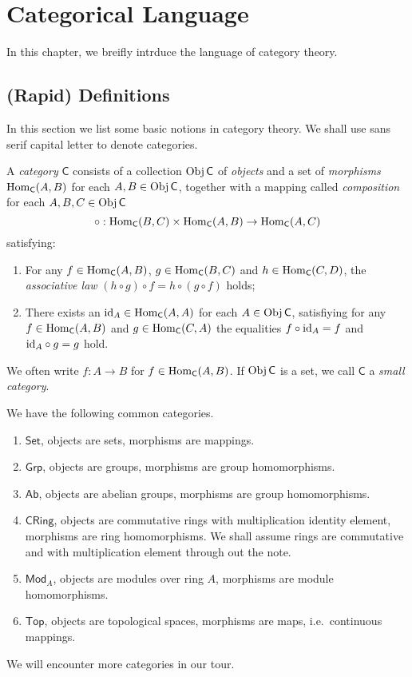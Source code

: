 \chapter{Categorical Language}

In this chapter, we breifly intrduce the language of category theory.

\section{(Rapid) Definitions}

In this section we list some basic notions in category theory.
We shall use sans serif capital letter to denote categories.

\begin{defn}
    A \emph{category} $\mathsf{C}$ consists of a collection $\operatorname{Obj}\mathsf{C}$ of \emph{objects} and a set of \emph{morphisms} $\operatorname{Hom}_\mathsf{C}(A,B)$ for each $A,B\in\operatorname{Obj}{\mathsf{C}}$, together with a mapping called \emph{composition} for each $A,B,C\in\operatorname{Obj}\mathsf{C}$
    \[\circ:\operatorname{Hom}_\mathsf{C}(B,C)\times\operatorname{Hom}_\mathsf{C}(A,B)\to\operatorname{Hom}_\mathsf{C}(A,C)\]
    satisfying:
    \begin{enumerate}[(1)]
        \item For any $f\in\operatorname{Hom}_\mathsf{C}(A,B)$, $g\in\operatorname{Hom}_\mathsf{C}(B,C)$ and $h\in\operatorname{Hom}_\mathsf{C}(C,D)$, the \emph{associative law} $(h\circ g)\circ f=h\circ(g\circ f)$ holds;
        \item There exists an $\mathrm{id}_A\in\operatorname{Hom}_\mathsf{C}(A,A)$ for each $A\in\operatorname{Obj}\mathsf{C}$, satisfiying for any $f\in\operatorname{Hom}_\mathsf{C}(A,B)$ and $g\in\operatorname{Hom}_\mathsf{C}(C,A)$ the equalities $f\circ\mathrm{id}_A=f$ and $\mathrm{id}_A\circ g=g$ hold.
    \end{enumerate}
    We often write $f:A\to B$ for $f\in\operatorname{Hom}_\mathsf{C}(A,B)$.
    If $\operatorname{Obj}\mathsf{C}$ is a set, we call $\mathsf{C}$ a \emph{small category}.
\end{defn}

\begin{eg}
    We have the following common categories.
    \begin{enumerate}
        \item $\mathsf{Set}$, objects are sets, morphisms are mappings.
        \item $\mathsf{Grp}$, objects are groups, morphisms are group homomorphisms.
        \item $\mathsf{Ab}$, objects are abelian groups, morphisms are group homomorphisms.
        \item $\mathsf{CRing}$, objects are commutative rings with multiplication identity element, morphisms are ring homomorphisms.
        We shall assume rings are commutative and with multiplication element through out the note.
        \item $\mathsf{Mod}_A$, objects are modules over ring $A$, morphisms are module homomorphisms.
        \item $\mathsf{Top}$, objects are topological spaces, morphisms are maps, i.e.\ continuous mappings.
    \end{enumerate}
    We will encounter more categories in our tour.
\end{eg}

